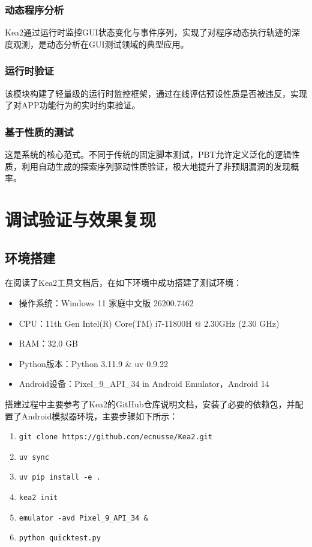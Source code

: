 \documentclass[a4paper, zihao=-4]{ctexart}
\begin{document}
\subsubsection{动态程序分析}
Kea2通过运行时监控GUI状态变化与事件序列，实现了对程序动态执行轨迹的深度观测，是动态分析在GUI测试领域的典型应用。

\subsubsection{运行时验证}
该模块构建了轻量级的运行时监控框架，通过在线评估预设性质是否被违反，实现了对APP功能行为的实时约束验证。

\subsubsection{基于性质的测试}
这是系统的核心范式。不同于传统的固定脚本测试，PBT允许定义泛化的逻辑性质，利用自动生成的探索序列驱动性质验证，极大地提升了非预期漏洞的发现概率。

\section{调试验证与效果复现}

\subsection{环境搭建}

在阅读了Kea2工具文档后，在如下环境中成功搭建了测试环境：
\begin{itemize}
    \item 操作系统：Windows 11 家庭中文版 26200.7462
    \item CPU：11th Gen Intel(R) Core(TM) i7-11800H @ 2.30GHz (2.30 GHz)
    \item RAM：32.0 GB
    \item Python版本：Python 3.11.9 \& uv 0.9.22
    \item Android设备：Pixel\_9\_API\_34 in Android Emulator，Android 14
\end{itemize}

搭建过程中主要参考了Kea2的GitHub仓库说明文档，安装了必要的依赖包，并配置了Android模拟器环境，主要步骤如下所示：
\begin{enumerate}
    \item \texttt{git clone https://github.com/ecnusse/Kea2.git}
    \item \texttt{uv sync}
    \item \texttt{uv pip install -e .}
    \item \texttt{kea2 init}
    \item \texttt{emulator -avd Pixel\_9\_API\_34 \&}
    \item \texttt{python quicktest.py}
\end{enumerate}
\end{document}
